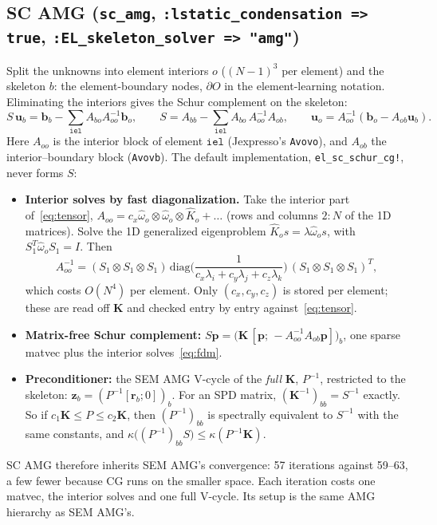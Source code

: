 \documentclass[11pt]{article}
\newcommand{\iel}{\mathtt{iel}}
\newcommand{\K}{\mathbf{K}}
\newcommand{\uu}{\mathbf{u}}
\newcommand{\bb}{\mathbf{b}}
\newcommand{\rr}{\mathbf{r}}
\newcommand{\zz}{\mathbf{z}}
\newcommand{\Khat}{\widehat{K}}
\newcommand{\What}{\widehat{\omega}}
\newcommand{\code}[1]{\texttt{#1}}
\begin{document}
\subsection{SC AMG (\code{sc\_amg}, \code{:lstatic\_condensation => true}, \code{:EL\_skeleton\_solver => "amg"})}
Split the unknowns into element interiors $o$ ($(N-1)^3$ per element) and the skeleton $b$: the
element-boundary nodes, $\partial O$ in the element-learning notation. Eliminating the interiors
gives the Schur complement on the skeleton:
\begin{equation}
  S\,\uu_b = \bb_b - \sum_{\iel} A_{bo}A_{oo}^{-1}\bb_o,\qquad
  S = A_{bb} - \sum_{\iel} A_{bo}\,A_{oo}^{-1}A_{ob},\qquad
  \uu_o = A_{oo}^{-1}(\bb_o - A_{ob}\uu_b).
  \label{eq:schur}
\end{equation}
Here $A_{oo}$ is the interior block of element $\iel$ (Jexpresso's \code{Avovo}), and $A_{ob}$ the
interior--boundary block (\code{Avovb}). The default implementation, \code{el\_sc\_schur\_cg!},
never forms $S$:
\begin{itemize}
  \item \textbf{Interior solves by fast diagonalization.} Take the interior part of~\eqref{eq:tensor},
        $A_{oo} = c_x\What_o\otimes\What_o\otimes\Khat_o + \dots$ (rows and columns $2{:}N$ of the 1D matrices).
        Solve the 1D generalized eigenproblem $\Khat_o s = \lambda\What_o s$, with $S_1^T\What_o S_1=I$. Then
        \begin{equation}
          A_{oo}^{-1} = (S_1\otimes S_1\otimes S_1)\,\mathrm{diag}\!\Big(\frac{1}{c_x\lambda_i+c_y\lambda_j+c_z\lambda_k}\Big)\,(S_1\otimes S_1\otimes S_1)^T,
          \label{eq:fdm}
        \end{equation}
        which costs $O(N^4)$ per element. Only $(c_x,c_y,c_z)$ is stored per element; these are read off
        $\K$ and checked entry by entry against~\eqref{eq:tensor}.
  \item \textbf{Matrix-free Schur complement:} $S\mathbf{p} = \big(\K\,[\mathbf{p};\,-A_{oo}^{-1}A_{ob}\mathbf{p}]\big)_b$,
        one sparse matvec plus the interior solves~\eqref{eq:fdm}.
  \item \textbf{Preconditioner:} the SEM AMG V-cycle of the \emph{full} $\K$, $P^{-1}$, restricted to the skeleton:
        $\zz_b = (P^{-1}[\rr_b;0])_b$. For an SPD matrix, $(\K^{-1})_{bb}=S^{-1}$ exactly. So if
        $c_1\K\le P\le c_2\K$, then $(P^{-1})_{bb}$ is spectrally equivalent to $S^{-1}$ with the same
        constants, and $\kappa\big((P^{-1})_{bb}S\big)\le\kappa(P^{-1}\K)$.
\end{itemize}
SC AMG therefore inherits SEM AMG's convergence: 57 iterations against 59--63, a few fewer because
CG runs on the smaller space. Each iteration costs one matvec, the interior solves and one full
V-cycle. Its setup is the same AMG hierarchy as SEM AMG's.
\end{document}
